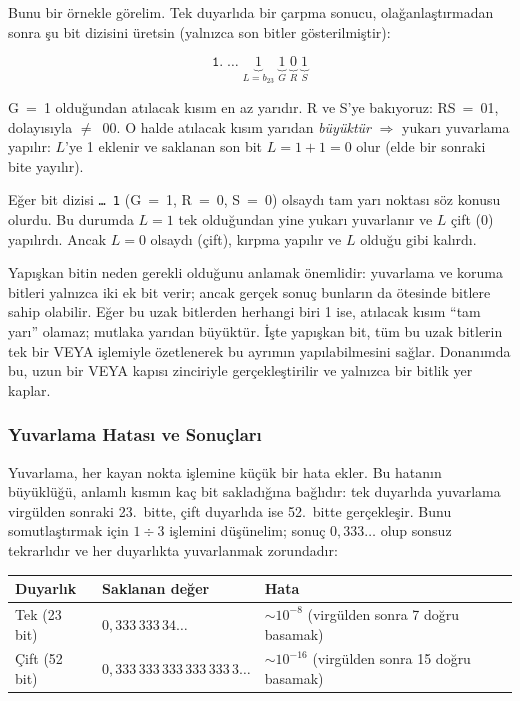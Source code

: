 Bunu bir örnekle görelim. Tek duyarlıda bir çarpma sonucu, olağanlaştırmadan sonra şu bit dizisini üretsin (yalnızca son bitler gösterilmiştir):

\[
\texttt{1.}\;\ldots\;\underbrace{1}_{L=b_{23}} \;\underbrace{1}_{G} \;\underbrace{0}_{R} \;\underbrace{1}_{S}
\]

G~=~1 olduğundan atılacak kısım en az yarıdır. R ve S'ye bakıyoruz: RS~=~01, dolayısıyla $\neq$~00. O halde atılacak kısım yarıdan \emph{büyüktür} $\Rightarrow$ yukarı yuvarlama yapılır: $L$'ye 1 eklenir ve saklanan son bit $L = 1 + 1 = 0$ olur (elde bir sonraki bite yayılır).

Eğer bit dizisi \texttt{\ldots\,1} (G~=~1, R~=~0, S~=~0) olsaydı tam yarı noktası söz konusu olurdu. Bu durumda $L = 1$ tek olduğundan yine yukarı yuvarlanır ve $L$ çift (0) yapılırdı. Ancak $L = 0$ olsaydı (çift), kırpma yapılır ve $L$ olduğu gibi kalırdı.

Yapışkan bitin neden gerekli olduğunu anlamak önemlidir: yuvarlama ve koruma bitleri yalnızca iki ek bit verir; ancak gerçek sonuç bunların da ötesinde bitlere sahip olabilir. Eğer bu uzak bitlerden herhangi biri 1 ise, atılacak kısım ``tam yarı'' olamaz; mutlaka yarıdan büyüktür. İşte yapışkan bit, tüm bu uzak bitlerin tek bir VEYA işlemiyle özetlenerek bu ayrımın yapılabilmesini sağlar. Donanımda bu, uzun bir VEYA kapısı zinciriyle gerçekleştirilir ve yalnızca bir bitlik yer kaplar.

\subsubsection{Yuvarlama Hatası ve Sonuçları}

Yuvarlama, her kayan nokta işlemine küçük bir hata ekler. Bu hatanın büyüklüğü, anlamlı kısmın kaç bit sakladığına bağlıdır: tek duyarlıda yuvarlama virgülden sonraki 23.\ bitte, çift duyarlıda ise 52.\ bitte gerçekleşir. Bunu somutlaştırmak için $1 \div 3$ işlemini düşünelim; sonuç $0{,}333\ldots$ olup sonsuz tekrarlıdır ve her duyarlıkta yuvarlanmak zorundadır:

\begin{center}
\small
\begin{tabular}{l l l}
\toprule
\textbf{Duyarlık} & \textbf{Saklanan değer} & \textbf{Hata} \\
\midrule
Tek (23 bit) & $0{,}333\,333\,34\ldots$ & $\sim 10^{-8}$ (virgülden sonra 7 doğru basamak) \\
Çift (52 bit) & $0{,}333\,333\,333\,333\,333\,3\ldots$ & $\sim 10^{-16}$ (virgülden sonra 15 doğru basamak) \\
\bottomrule
\end{tabular}
\end{center}

